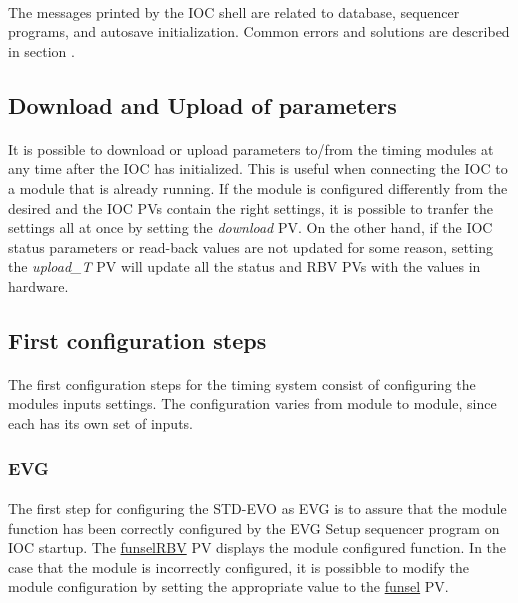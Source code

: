 \documentclass[openany]{article}
\begin{document}
		\paragraph{} The messages printed by the IOC shell are related to database, sequencer programs, and autosave initialization. Common errors and solutions are described in section . 

	\subsection{Download and Upload of parameters}
		\paragraph{} It is possible to download or upload parameters to/from the timing modules at any time after the IOC has initialized. This is useful when connecting the IOC to a module that is already running. If the module is configured differently from the desired and the IOC PVs contain the right settings, it is possible to tranfer the settings all at once by setting the \emph{download} PV. On the other hand, if the IOC status parameters or read-back values are not updated for some reason, setting the \emph{upload\_T} PV will update all the status and RBV PVs with the values in hardware.

	\subsection{First configuration steps}
		\paragraph{} The first configuration steps for the timing system consist of configuring the modules inputs settings. The configuration varies from module to module, since each has its own set of inputs.

		\subsubsection{EVG}

			\paragraph{} The first step for configuring the STD-EVO as EVG is to assure that the module function has been
correctly configured by the EVG Setup sequencer program on IOC startup. The \hyperref[pvgroup:evg-configuration]{funselRBV} PV displays the module configured function. In the case that the module is incorrectly configured, it is possibble to modify the module configuration by setting the appropriate value to the \hyperref[pvgroup:evg-configuration]{funsel} PV.
\end{document}
